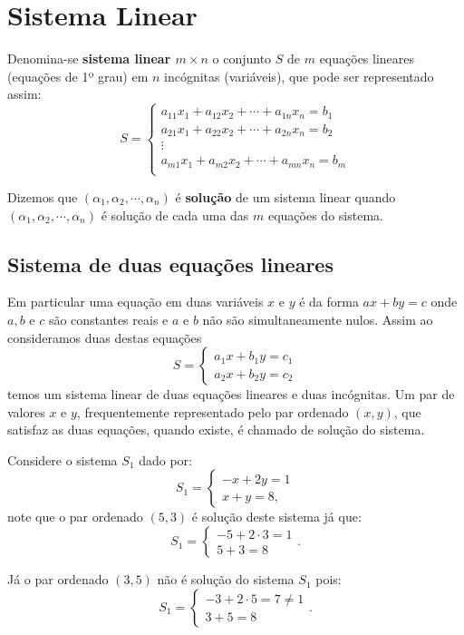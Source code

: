 \chapter{Sistema Linear}

Denomina-se \textbf{sistema linear $m \times n$} o conjunto $S$ de $m$ equações lineares (equações de 1º grau) em $n$ incógnitas (variáveis), que pode ser representado assim:
\[S= \begin{cases}
      a_{11}x_1 + a_{12}x_2 + \cdots + a_{1n}x_n = b_1 \\
      a_{21}x_1 + a_{22}x_2 + \cdots + a_{2n}x_n = b_2 \\
      \vdots \\
      a_{m1}x_1 + a_{m2}x_2 + \cdots + a_{mn}x_n = b_m \\
     \end{cases} \]

Dizemos que $(\alpha_1, \alpha_2, \cdots, \alpha_n)$ é \textbf{solução} de um sistema linear quando $(\alpha_1, \alpha_2, \cdots, \alpha_n)$ é solução de cada uma das $m$ equações do sistema.

\section{Sistema de duas equações lineares}

\vskip0.3cm
 \colorbox{azul}{
 \begin{minipage}{0.9\linewidth}

  Em particular uma equação em duas variáveis $x$ e $y$ é da forma $ax + by= c$ onde $a, b$ e $c$ são constantes reais e $a$ e $b$ não são simultaneamente nulos. Assim ao consideramos duas destas equações
  \[S= \begin{cases}
      a_1x + b_1y= c_1 \\
      a_2x + b_2y= c_2
     \end{cases}\]
 temos um sistema linear de duas equações lineares e duas incógnitas. Um par de valores $x$ e $y$, frequentemente representado pelo par ordenado $(x, y)$, que satisfaz as duas equações, quando existe, é chamado de solução do sistema.

 \end{minipage}}
 \vskip0.3cm

\begin{exem}
 Considere o sistema $S_1$ dado por:
 \[S_1= \begin{cases}
      -x + 2y= 1 \\
      x + y= 8,
     \end{cases}\]
 note que o par ordenado $(5, 3)$ é solução deste sistema já que:
 \[S_1= \begin{cases}
      -5 + 2 \cdot 3= 1 \\
      5 + 3= 8
     \end{cases} .\]

Já o par ordenado $(3, 5)$ não é solução do sistema $S_1$ pois:
\[S_1= \begin{cases}
      -3 + 2 \cdot 5= 7 \neq 1 \\
      3 + 5= 8
     \end{cases} .\]
\end{exem}

